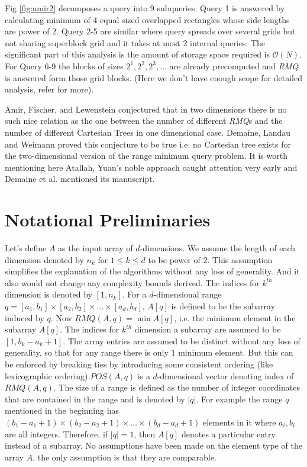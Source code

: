 Fig \ref{fig:amir2} decomposes a query into 9 subqueries. Query 1 is answered by calculating minimum of 4 equal sized overlapped rectangles whose side lengths are power of 2. Query 2-5 are similar where query spreads over several grids but not sharing superblock grid and it takes at most 2 internal queries. The significant part of this analysis is the amount of storage space required is $\mathcal{O}(N)$. For Query 6-9 the blocks of sizes $2^1, 2^2, 2^3,\ldots$ are already precomputed and \emph{RMQ} is answered form those grid blocks. (Here we don't have enough scope for detailed analysis, refer \cite{p7} for more). 

Amir, Fischer, and Lewenstein conjectured that in two dimensions there is no such nice relation as the one between the number of different \emph{RMQ}s and the number of different Cartesian Trees in one dimensional case. Demaine, Landau and Weimann \cite{p2} proved this conjecture to be true i.e. no Cartesian tree exists for the two-dimensional version of the range minimum query problem. It is worth mentioning here Atallah, Yuan's noble approach caught attention very early and Demaine et al. \cite{p2} mentioned its manuscript.

\section{Notational Preliminaries}
Let's define $A$ as the input array of $d$-dimensions. We assume the length of each dimension denoted by $n_k$ for $1\leq k\leq d$ to be power of $2$. This assumption simplifies the explanation of the algorithms without any loss of generality. And it also would not change any complexity bounds derived. The indices for $k^{th}$ dimension is denoted by $[1,n_k]$. For a $d$-dimensional range $q=[a_1,b_1]\times[a_2,b_2]\times\ldots\times[a_d,b_d]$, $A[q]$ is defined to be the subarray induced by $q$. Now $RMQ(A,q)=\min A[q]$, i.e. the minimum element in the subarray $A[q]$. The indices for $k^{th}$ dimension a subarray are assumed to be $[1,b_k-a_k+1]$. The array entries are assumed to be distinct without any loss of generality, so that for any range there is only $1$ minimum element. But this can be enforced by breaking ties by introducing some consistent ordering (like lexicographic ordering).$POS(A,q)$ is a $d$-dimensional vector denoting index of $RMQ(A,q)$. The size of a range is defined as the number of integer coordinates that are contained in the range and is denoted by $\left\vert q\right\vert$. For example the range $q$ mentioned in the beginning has $(b_1-a_1+1)\times(b_2-a_2+1)\times\ldots\times(b_d-a_d+1)$ elements in it where $a_i,b_i$ are all integers. Therefore, if $\left\vert q\right\vert =1$, then $A[q]$ denotes a particular entry instead of a subarray. No assumptions have been made on the element type of the array $A$, the only assumption is that they are comparable.




